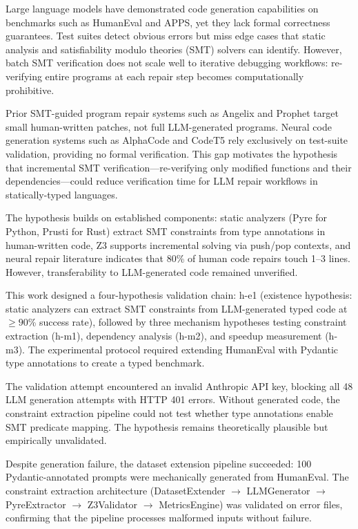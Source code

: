
Large language models have demonstrated code generation capabilities on benchmarks such as HumanEval and APPS, yet they lack formal correctness guarantees. Test suites detect obvious errors but miss edge cases that static analysis and satisfiability modulo theories (SMT) solvers can identify. However, batch SMT verification does not scale well to iterative debugging workflows: re-verifying entire programs at each repair step becomes computationally prohibitive.

Prior SMT-guided program repair systems such as Angelix and Prophet target small human-written patches, not full LLM-generated programs. Neural code generation systems such as AlphaCode and CodeT5 rely exclusively on test-suite validation, providing no formal verification. This gap motivates the hypothesis that incremental SMT verification---re-verifying only modified functions and their dependencies---could reduce verification time for LLM repair workflows in statically-typed languages.

The hypothesis builds on established components: static analyzers (Pyre for Python, Prusti for Rust) extract SMT constraints from type annotations in human-written code, Z3 supports incremental solving via push/pop contexts, and neural repair literature indicates that 80\% of human code repairs touch 1--3 lines. However, transferability to LLM-generated code remained unverified.

This work designed a four-hypothesis validation chain: h-e1 (existence hypothesis: static analyzers can extract SMT constraints from LLM-generated typed code at $\geq 90$\% success rate), followed by three mechanism hypotheses testing constraint extraction (h-m1), dependency analysis (h-m2), and speedup measurement (h-m3). The experimental protocol required extending HumanEval with Pydantic type annotations to create a typed benchmark.

The validation attempt encountered an invalid Anthropic API key, blocking all 48 LLM generation attempts with HTTP 401 errors. Without generated code, the constraint extraction pipeline could not test whether type annotations enable SMT predicate mapping. The hypothesis remains theoretically plausible but empirically unvalidated.

Despite generation failure, the dataset extension pipeline succeeded: 100 Pydantic-annotated prompts were mechanically generated from HumanEval. The constraint extraction architecture (DatasetExtender $\rightarrow$ LLMGenerator $\rightarrow$ PyreExtractor $\rightarrow$ Z3Validator $\rightarrow$ MetricsEngine) was validated on error files, confirming that the pipeline processes malformed inputs without failure.

